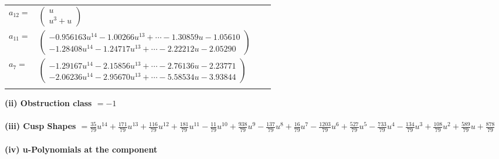 \documentclass[1p]{elsarticle_modified}
\theoremstyle{definition}
\begin{document}
\begin{tabular}{m{7pt} m{180pt} m{7pt} m{180pt} }
\flushright $a_{12}=$&$\begin{pmatrix}u\\u^3+u\end{pmatrix}$ \\
\flushright $a_{11}=$&$\begin{pmatrix}-0.956163 u^{14}-1.00266 u^{13}+\cdots-1.30859 u-1.05610\\-1.28408 u^{14}-1.24717 u^{13}+\cdots-2.22212 u-2.05290\end{pmatrix}$ \\
\flushright $a_{7}=$&$\begin{pmatrix}-1.29167 u^{14}-2.15856 u^{13}+\cdots-2.76136 u-2.23771\\-2.06236 u^{14}-2.95670 u^{13}+\cdots-5.58534 u-3.93844\end{pmatrix}$\\&\end{tabular}
\flushleft \textbf{(ii) Obstruction class $= -1$}\\~\\
\flushleft \textbf{(iii) Cusp Shapes $= \frac{35}{79} u^{14}+\frac{171}{79} u^{13}+\frac{116}{79} u^{12}+\frac{181}{79} u^{11}-\frac{11}{79} u^{10}+\frac{938}{79} u^9-\frac{137}{79} u^8+\frac{16}{79} u^7-\frac{1203}{79} u^6+\frac{527}{79} u^5-\frac{733}{79} u^4-\frac{134}{79} u^3+\frac{108}{79} u^2+\frac{589}{79} u+\frac{878}{79}$}\\~\\
\newpage\renewcommand{\arraystretch}{1}
\flushleft \textbf{(iv) u-Polynomials at the component}\newline \\
\end{document}
